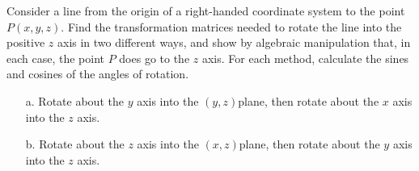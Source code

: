 \documentclass[math-font=newcm]{sjtuarticle}
\begin{document}
Consider a line from the origin of a right-handed coordinate system to the point $P(x, y, z)$. Find the transformation matrices needed to rotate the line into the positive $z$ axis in two different ways, and show by algebraic
manipulation that, in each case, the point $P$ does go to the $z$ axis. For each method, calculate the sines and
cosines of the angles of rotation.
\begin{enumerate}
    \item[a.] Rotate about the $y$ axis into the $(y, z)$plane, then rotate about the $x$ axis into the $z$ axis.
    \item[b.] Rotate about the $z$ axis into the $(x, z)$plane, then rotate about the $y$ axis into the $z$ axis.
\end{enumerate}

\begin{solution}
    \begin{figure}[h]
        \begin{subfigure}{.5\textwidth}
        \centering
\end{subfigure}
\end{figure}
\end{solution}
\end{document}
